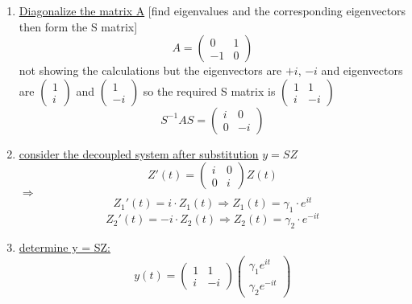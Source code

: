 \documentclass{article}
\begin{document}
\begin{enumerate}
    \item \underline{Diagonalize the matrix A} [find eigenvalues and the corresponding eigenvectors then form the S matrix]\begin{equation*} A = \begin{pmatrix} 0 & 1 \\ -1 & 0 \end{pmatrix} \end{equation*}
    not showing the calculations but the eigenvectors are $+i$, $-i$ and eigenvectors are $\begin{pmatrix} 1 \\ i \end{pmatrix}$ and $\begin{pmatrix} 1 \\ -i \end{pmatrix}$ so the required S matrix is $\begin{pmatrix} 1 & 1 \\ i & -i \end{pmatrix}$ \\
    \begin{equation*} S^{-1}AS = \begin{pmatrix} i & 0 \\ 0 & -i \end{pmatrix} \end{equation*}
    \item \underline{consider the decoupled system after substitution} $y=SZ$ \\
    \begin{equation*} Z'(t) = \begin{pmatrix} i & 0 \\ 0 & i \end{pmatrix} Z(t)\end{equation*}
    $\Rightarrow$
    \begin{equation*} Z_1'(t) = i\cdot Z_1(t) \Rightarrow Z_1(t) = \gamma_1 \cdot e^{i t} \end{equation*}
    \begin{equation*} Z_2'(t) = -i \cdot Z_2(t) \Rightarrow Z_2(t) = \gamma_2 \cdot e^{-i t} \end{equation*}
    \item \underline{determine y = SZ:} \begin{equation*} y(t) = \begin{pmatrix} 1 & 1 \\ i & -i \end{pmatrix} \begin{pmatrix} \gamma_1 e^{i t} \\ \gamma_2 e^{-i t} \end{pmatrix}\end{equation*}  

\end{enumerate}
\end{document}
